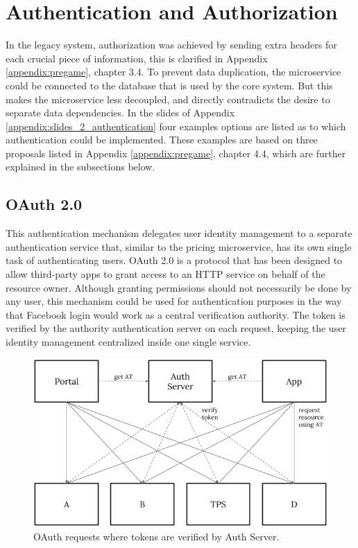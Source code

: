 \section{Authentication and Authorization}
In the legacy system, authorization was achieved by sending extra headers for each crucial piece of information, this is clarified in Appendix \ref{appendix:pregame}, chapter 3.4. To prevent data duplication, the microservice could be connected to the database that is used by the core system. But this makes the microservice less decoupled, and directly contradicts the desire to separate data dependencies. In the slides of Appendix \ref{appendix:slides_2_authentication} four examples options are listed as to which authentication could be implemented. These examples are based on three proposals listed in Appendix \ref{appendix:pregame}, chapter 4.4, which are further explained in the subsections below.

\subsection{OAuth 2.0}
This authentication mechanism delegates user identity management to a separate authentication service that, similar to the pricing microservice, has its own single task of authenticating users. OAuth 2.0 is a protocol that has been designed to allow third-party apps to grant access to an HTTP service on behalf of the resource owner. Although granting permissions should not necessarily be done by any user, this mechanism could be used for authentication purposes in the way that Facebook login would work as a central verification authority. The token is verified by the authority authentication server on each request, keeping the user identity management centralized inside one single service.

\begin{figure}[H]
	\centering
	\includegraphics[width=.7\textwidth]{Auth1}
	\caption[Proposal OAuth 2.0]{OAuth requests where tokens are verified by Auth Server.}
	\label{fig:Auth1}
\end{figure}

